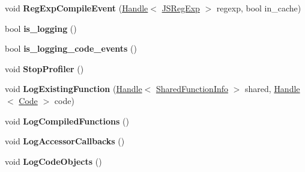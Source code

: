 \begin{DoxyCompactItemize}
\item 
\hypertarget{classv8_1_1internal_1_1_logger_ab86c8d7f4c3bd5fe25da5d2e06e22ab7}{}void {\bfseries Reg\+Exp\+Compile\+Event} (\hyperlink{classv8_1_1internal_1_1_handle}{Handle}$<$ \hyperlink{classv8_1_1internal_1_1_j_s_reg_exp}{J\+S\+Reg\+Exp} $>$ regexp, bool in\+\_\+cache)\label{classv8_1_1internal_1_1_logger_ab86c8d7f4c3bd5fe25da5d2e06e22ab7}

\item 
\hypertarget{classv8_1_1internal_1_1_logger_aed323c6dffe4aabc969b080bfe782adf}{}bool {\bfseries is\+\_\+logging} ()\label{classv8_1_1internal_1_1_logger_aed323c6dffe4aabc969b080bfe782adf}

\item 
\hypertarget{classv8_1_1internal_1_1_logger_a2e0360fdc59a61c63402a1bc24147cdd}{}bool {\bfseries is\+\_\+logging\+\_\+code\+\_\+events} ()\label{classv8_1_1internal_1_1_logger_a2e0360fdc59a61c63402a1bc24147cdd}

\item 
\hypertarget{classv8_1_1internal_1_1_logger_af83f62b2d37eb53cf3b89eb10ee17bbe}{}void {\bfseries Stop\+Profiler} ()\label{classv8_1_1internal_1_1_logger_af83f62b2d37eb53cf3b89eb10ee17bbe}

\item 
\hypertarget{classv8_1_1internal_1_1_logger_a9260570804a25f407e12e54898a34c04}{}void {\bfseries Log\+Existing\+Function} (\hyperlink{classv8_1_1internal_1_1_handle}{Handle}$<$ \hyperlink{classv8_1_1internal_1_1_shared_function_info}{Shared\+Function\+Info} $>$ shared, \hyperlink{classv8_1_1internal_1_1_handle}{Handle}$<$ \hyperlink{classv8_1_1internal_1_1_code}{Code} $>$ code)\label{classv8_1_1internal_1_1_logger_a9260570804a25f407e12e54898a34c04}

\item 
\hypertarget{classv8_1_1internal_1_1_logger_a7372775745f2f974a600996232acc7d6}{}void {\bfseries Log\+Compiled\+Functions} ()\label{classv8_1_1internal_1_1_logger_a7372775745f2f974a600996232acc7d6}

\item 
\hypertarget{classv8_1_1internal_1_1_logger_a4d77e3ce92369187c58127754a9fa149}{}void {\bfseries Log\+Accessor\+Callbacks} ()\label{classv8_1_1internal_1_1_logger_a4d77e3ce92369187c58127754a9fa149}

\item 
\hypertarget{classv8_1_1internal_1_1_logger_acf57b8270cf5f12f6b1c1a4810011306}{}void {\bfseries Log\+Code\+Objects} ()\label{classv8_1_1internal_1_1_logger_acf57b8270cf5f12f6b1c1a4810011306}


\end{DoxyCompactItemize}
